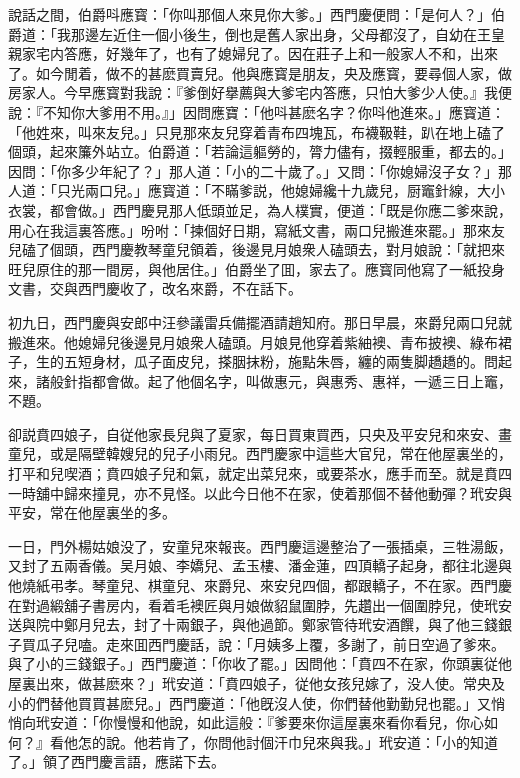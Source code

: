 說話之間，伯爵呌應寳：「你叫那個人來見你大爹。」西門慶便問：「是何人？」伯爵道：「我那邊左近住一個小後生，倒也是舊人家出身，父母都沒了，自幼在王皇親家宅内答應，好幾年了，也有了媳婦兒了。因在莊子上和一般家人不和，出來了。如今閒着，做不的甚麽買賣兒。他與應寳是朋友，央及應寳，要尋個人家，做房家人。今早應寳對我說：『爹倒好擧薦與大爹宅内答應，只怕大爹少人使。』我便說：『不知你大爹用不用。』」因問應寶：「他呌甚麽名字？你呌他進來。」應寳道：「他姓來，叫來友兒。」只見那來友兒穿着青布四塊瓦，布襪靸鞋，趴在地上磕了個頭，起來簾外站立。伯爵道：「若論這軀勞的，膂力儘有，掇輕服重，都去的。」因問：「你多少年紀了？」那人道：「小的二十歲了。」又問：「你媳婦沒子女？」那人道：「只光兩口兒。」應寳道：「不瞞爹説，他媳婦纔十九歲兒，厨竈針線，大小衣裳，都會做。」西門慶見那人低頭並足，為人樸實，便道：「既是你應二爹來說，用心在我這裏答應。」吩咐：「揀個好日期，寫紙文書，兩口兒搬進來罷。」那來友兒磕了個頭，西門慶教琴童兒領着，後邊見月娘衆人磕頭去，對月娘說：「就把來旺兒原住的那一間房，與他居住。」伯爵坐了囬，家去了。應寳同他寫了一紙投身文書，交與西門慶收了，改名來爵，不在話下。

初九日，西門慶與安郎中汪參議雷兵備擺酒請趙知府。那日早晨，來爵兒兩口兒就搬進來。他媳婦兒後邊見月娘衆人磕頭。月娘見他穿着紫紬襖、青布披襖、綠布裙子，生的五短身材，瓜子面皮兒，搽胭抹粉，施點朱唇，纏的兩隻脚趫趫的。問起來，諸般針指都會做。起了他個名字，叫做惠元，與惠秀、惠祥，一遞三日上竈，不題。

卻説賁四娘子，自従他家長兒與了夏家，每日買東買西，只央及平安兒和來安、畫童兒，或是隔壁韓嫂兒的兒子小雨兒。西門慶家中這些大官兒，常在他屋裏坐的，打平和兒喫酒；賁四娘子兒和氣，就定出菜兒來，或要茶水，應手而至。就是賁四一時舖中歸來撞見，亦不見怪。以此今日他不在家，使着那個不替他動彈？玳安與平安，常在他屋裏坐的多。

一日，門外楊姑娘没了，安童兒來報丧。西門慶這邊整治了一張插桌，三牲湯飯，又封了五兩香儀。吴月娘、李嬌兒、孟玉樓、潘金蓮，四頂轎子起身，都往北邊與他燒紙弔孝。琴童兒、棋童兒、來爵兒、來安兒四個，都跟轎子，不在家。西門慶在對過緞舖子書房内，看着毛襖匠與月娘做貂鼠圍脖，先趲出一個圍脖兒，使玳安送與院中鄭月兒去，封了十兩銀子，與他過節。鄭家管待玳安酒饌，與了他三錢銀子買瓜子兒嗑。走來囬西門慶話，說：「月姨多上覆，多謝了，前日空過了爹來。與了小的三錢銀子。」西門慶道：「你收了罷。」因問他：「賁四不在家，你頭裏従他屋裏出來，做甚麽來？」玳安道：「賁四娘子，従他女孩兒嫁了，没人使。常央及小的們替他買買甚麽兒。」西門慶道：「他旣沒人使，你們替他勤勤兒也罷。」又悄悄向玳安道：「你慢慢和他說，如此這般：『爹要來你這屋裏來看你看兒，你心如何？』看他怎的說。他若肯了，你問他討個汗巾兒來與我。」玳安道：「小的知道了。」領了西門慶言語，應諾下去。

